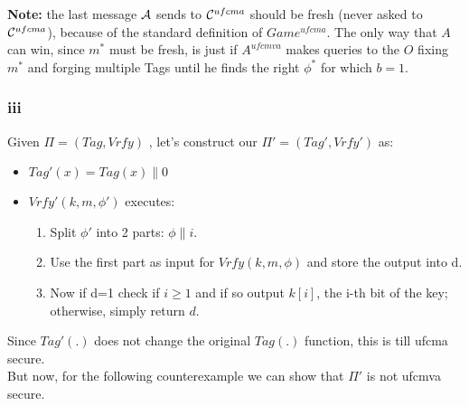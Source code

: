 \documentclass[11pt]{article}
\newcounter{t0d0_counter}
\begin{document}
\textbf{Note:} the last message $\mathcal{A}$ sends to $\mathcal{C}^{ufcma}$ should be fresh
(never asked to $\mathcal{C}^{ufcma}$), because of the standard definition of
$Game^{ufcma}$. The only way that $A$ can win, since $m^*$ must be fresh, is
just if $A^{ufcmva}$ makes queries to the $O$ fixing $m^*$ and forging multiple
Tags until he finds the right $\phi^*$ for which  $b=1$.  \newpage
\subsubsection{ iii }
Given $\Pi=(Tag, Vrfy)$ , let's construct our $\Pi'=(Tag', Vrfy')$ as:
\begin{itemize}
   \item $Tag'(x)=Tag(x)\|0$
   \item $Vrfy'(k,m,\phi')$ executes:
   \begin{enumerate}
      \item Split $\phi'$ into 2 parts: $\phi \| i$.
      \item Use the first part as input for $Vrfy(k,m,\phi)$ and store the
          output into d.
      \item Now if d=1 check if $i \geq 1$ and if so output $k[i]$, the i-th
  bit of the key; otherwise, simply return $d$.
   \end{enumerate}
\end{itemize}

Since $Tag'(.)$ does not change the original $Tag(.)$ function, this is till ufcma secure.\\
But now, for the following counterexample we can show that $\Pi'$ is not ufcmva secure.

\begin{figure}[h!]
   \centering
   \sdinit{}
\end{figure}
\end{document}
